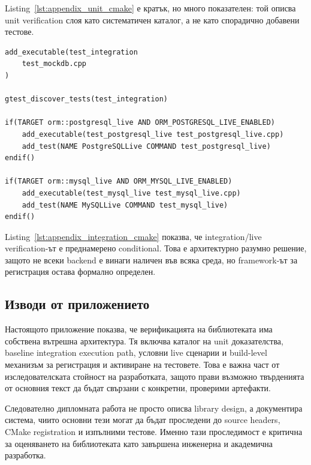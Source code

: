 Listing~\ref{lst:appendix_unit_cmake} е кратък, но много показателен: той описва unit verification слоя като систематичен каталог, а не като спорадично добавени тестове.

\begin{lstlisting}[caption={Извадка от conditional live test registration-а},label={lst:appendix_integration_cmake}]
add_executable(test_integration
    test_mockdb.cpp
)

gtest_discover_tests(test_integration)

if(TARGET orm::postgresql_live AND ORM_POSTGRESQL_LIVE_ENABLED)
    add_executable(test_postgresql_live test_postgresql_live.cpp)
    add_test(NAME PostgreSQLLive COMMAND test_postgresql_live)
endif()

if(TARGET orm::mysql_live AND ORM_MYSQL_LIVE_ENABLED)
    add_executable(test_mysql_live test_mysql_live.cpp)
    add_test(NAME MySQLLive COMMAND test_mysql_live)
endif()
\end{lstlisting}

Listing~\ref{lst:appendix_integration_cmake} показва, че integration/live verification-ът е преднамерено conditional. Това е архитектурно разумно решение, защото не всеки backend е винаги наличен във всяка среда, но framework-ът за регистрация остава формално определен.

\subsection{Изводи от приложението}

Настоящото приложение показва, че верификацията на библиотеката има собствена вътрешна архитектура. Тя включва каталог на unit доказателства, baseline integration execution path, условни live сценарии и build-level механизъм за регистрация и активиране на тестовете. Това е важна част от изследователската стойност на разработката, защото прави възможно твърденията от основния текст да бъдат свързани с конкретни, проверими артефакти.

Следователно дипломната работа не просто описва library design, а документира система, чиито основни тези могат да бъдат проследени до source headers, CMake registration и изпълними тестове. Именно тази проследимост е критична за оценяването на \ORMName{} библиотеката като завършена инженерна и академична разработка.
